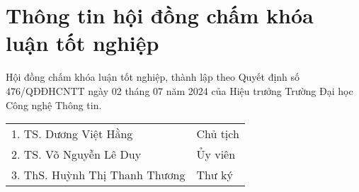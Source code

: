 \chapter*{\centering\Large{Thông tin hội đồng chấm khóa luận tốt nghiệp}}
Hội đồng chấm khóa luận tốt nghiệp, thành lập theo Quyết định số 476/QĐĐHCNTT ngày 02 tháng 07 năm 2024 của Hiệu trưởng Trường Đại học Công nghệ Thông tin.
\begin{center}
    \begin{tabular}{ p{} p{}} 
        1. TS. Dương Việt Hằng    & Chủ tịch \\
        2. TS. Võ Nguyễn Lê Duy & Ủy viên \\ 
        3. ThS. Huỳnh Thị Thanh Thương    & Thư ký \\ 
    \end{tabular} 
\end{center}